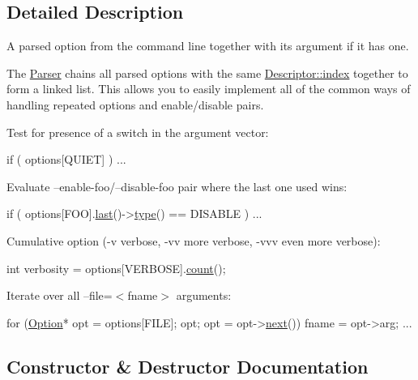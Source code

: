 \subsection{Detailed Description}
A parsed option from the command line together with its argument if it has one. 

The \hyperlink{classoption_1_1_parser}{Parser} chains all parsed options with the same \hyperlink{structoption_1_1_descriptor_a1fee8ac44f529c99ac2b1149b4c391b1}{Descriptor\+::index} together to form a linked list. This allows you to easily implement all of the common ways of handling repeated options and enable/disable pairs.

\begin{DoxyItemize}
\item Test for presence of a switch in the argument vector\+: 
\begin{DoxyCode}
\textcolor{keywordflow}{if} ( options[QUIET] ) ... 
\end{DoxyCode}
 \item Evaluate --enable-\/foo/--disable-\/foo pair where the last one used wins\+: 
\begin{DoxyCode}
\textcolor{keywordflow}{if} ( options[FOO].\hyperlink{classoption_1_1_option_afe2aff68191e55b59c53fac3dbbcd7c3}{last}()->\hyperlink{classoption_1_1_option_a5268a69e1a91137186ab772574296da0}{type}() == DISABLE ) ... 
\end{DoxyCode}
 \item Cumulative option (-\/v verbose, -\/vv more verbose, -\/vvv even more verbose)\+: 
\begin{DoxyCode}
\textcolor{keywordtype}{int} verbosity = options[VERBOSE].\hyperlink{classoption_1_1_option_ad26a118ffebde656fd82c06709086bed}{count}(); 
\end{DoxyCode}
 \item Iterate over all --file=$<$fname$>$ arguments\+: 
\begin{DoxyCode}
\textcolor{keywordflow}{for} (\hyperlink{classoption_1_1_option_aa2810152fc23b14175b115d1a7d38095}{Option}* opt = options[FILE]; opt; opt = opt->\hyperlink{classoption_1_1_option_a59ae9aed505f4d410633bb36478a32be}{next}())
 fname = opt->arg; ... 
\end{DoxyCode}
 \end{DoxyItemize}


\subsection{Constructor \& Destructor Documentation}
\mbox{\label{classoption_1_1_option_a385221e2a8f37c548f0d5777bfddb216}} 
